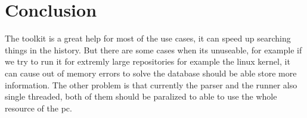 \chapter{Conclusion}
\label{ch:sum}

The toolkit is a great help for most of the use cases, it can speed up searching things in the history.
But there are some cases when its unuseable, for example if we try to run it for extremly large repositories
for example the linux kernel, it can cause out of memory errors to solve the database should be able store more
information. The other problem is that currently the parser and the runner also single threaded, both of them
should be paralized to able to use the whole resource of the pc.